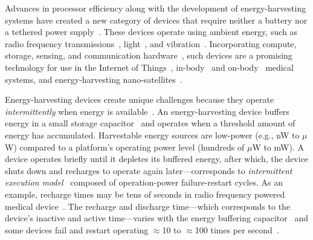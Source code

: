 

Advances in processor efficiency along with the development of
energy-harvesting systems have created a new category of devices that require
neither a battery nor a tethered power
supply~\citep{prasad_comst_2014,lucia_snapl_2017,soyata_csm_2016}. These
devices operate using ambient energy, such as radio frequency
transmissions~\citep{rf_powered_computing_gollakota_2014},
light~\citep{margolies_infocom_2016,margolies_tosn_2016}, and
vibration~\citep{gorlatova_sigmetrics_2014}. Incorporating compute, storage,
sensing, and communication hardware~\citep{wisp5,moo,capybara}, such devices are a
promising technology for use in the Internet of Things~\citep{ku_cst_2016},
in-body~\citep{nadeau_naturebio_2017} and
on-body~\citep{bandodkar_electroanalysis_2015} medical systems, and
energy-harvesting nano-satellites~\citep{kicksat,capybara}.

Energy-harvesting devices create unique challenges because they operate {\em
intermittently} when energy is
available~\citep{hicks_isca_2017,lucia_snapl_2017}. An energy-harvesting device
buffers energy in a small storage capacitor~\citep{gorlatova_tmc_2013,gunduz_commag_2014} and operates when a
threshold amount of energy has accumulated. Harvestable energy sources are low-power (e.g., nW to $\mu$W) compared to a platform's operating
power level (hundreds of $\mu$W to mW). A device operates briefly until it depletes its buffered energy, after which, the device shuts
down and recharges to operate again later---corresponds to {\em intermittent execution model}~\citep{dino,lucia_snapl_2017} composed of
operation-power failure-restart cycles. As an example, recharge times may be
tens of seconds in radio frequency powered medical device~\cite[Fig.
3c]{nadeau_naturebio_2017}. The recharge and discharge time---which corresponds to the device's inactive and active time---varies with the energy buffering capacitor~\cite{capybara} and some devices fail and restart operating $\approx$10 to
$\approx$100 times per second~\citep{tan_infocom_2016,mementos,nvp}.  

